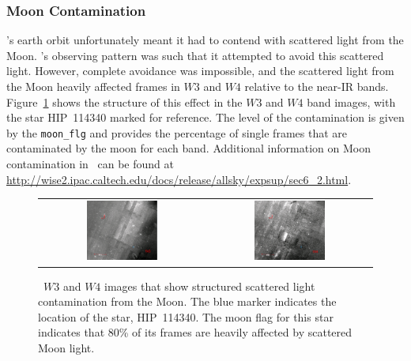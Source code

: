     
        \subsubsection{Moon Contamination}
        
        \WS's earth orbit unfortunately meant it had to contend with scattered light from the Moon. \WS's observing pattern was such that it attempted to avoid this scattered light. However, complete avoidance was impossible, and the scattered light from the Moon heavily affected frames in $W3$ and $W4$ relative to the near-IR bands. Figure~\ref{fig:moonflag_contamination} shows the structure of this effect in the $W3$ and $W4$ band images, with the star HIP~114340 marked for reference. The level of the contamination is given by the \verb|moon_flg| and provides the percentage of single frames that are contaminated by the moon for each band. Additional information on Moon contamination in \WS\ can be found at \url{http://wise2.ipac.caltech.edu/docs/release/allsky/expsup/sec6_2.html}.
        
        \begin{figure}
        \begin{tabular}{cc}
        \includegraphics[width=0.45\textwidth]{Ch2/moonflg_HIP114340_W3_88}&
        \includegraphics[width=0.45\textwidth]{Ch2/moonflg_HIP114340_W4_88}
        \end{tabular}
        \caption[Contamination from scattered Moon light]{\WS\ $W3$ and $W4$ images that show structured scattered light contamination from the Moon. The blue marker indicates the location of the star, HIP~114340. The moon flag for this star indicates that 80\% of its frames are heavily affected by scattered Moon light.}
        \label{fig:moonflag_contamination}
        \end{figure}
    
